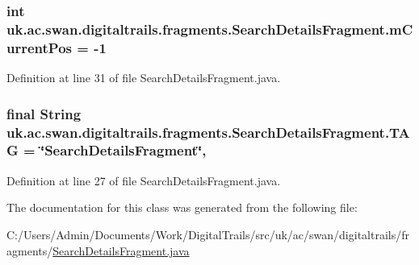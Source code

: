\hypertarget{classuk_1_1ac_1_1swan_1_1digitaltrails_1_1fragments_1_1_search_details_fragment_a16065bb282f9f9d09aac680ca319a957}{
\subsubsection[{m\+Current\+Pos}]{\setlength{\rightskip}{0pt plus 5cm}int uk.\+ac.\+swan.\+digitaltrails.\+fragments.\+Search\+Details\+Fragment.\+m\+Current\+Pos = -\/1\hspace{0.3cm}{\ttfamily [private]}}}\label{classuk_1_1ac_1_1swan_1_1digitaltrails_1_1fragments_1_1_search_details_fragment_a16065bb282f9f9d09aac680ca319a957}


Definition at line 31 of file Search\+Details\+Fragment.\+java.

\hypertarget{classuk_1_1ac_1_1swan_1_1digitaltrails_1_1fragments_1_1_search_details_fragment_a0ec83a6f3697db1d9df087a58e81ee34}{
\subsubsection[{T\+A\+G}]{\setlength{\rightskip}{0pt plus 5cm}final String uk.\+ac.\+swan.\+digitaltrails.\+fragments.\+Search\+Details\+Fragment.\+T\+A\+G = \char`\"{}Search\+Details\+Fragment\char`\"{}\hspace{0.3cm}{\ttfamily [static]}, {\ttfamily [private]}}}\label{classuk_1_1ac_1_1swan_1_1digitaltrails_1_1fragments_1_1_search_details_fragment_a0ec83a6f3697db1d9df087a58e81ee34}


Definition at line 27 of file Search\+Details\+Fragment.\+java.



The documentation for this class was generated from the following file\+:\begin{DoxyCompactItemize}
\item 
C\+:/\+Users/\+Admin/\+Documents/\+Work/\+Digital\+Trails/src/uk/ac/swan/digitaltrails/fragments/\hyperlink{_search_details_fragment_8java}{Search\+Details\+Fragment.\+java}\end{DoxyCompactItemize}
